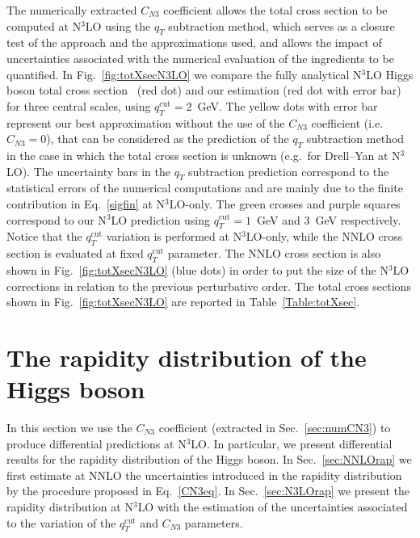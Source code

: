 \documentclass[12pt]{article}
\DeclareRobustCommand{\qt}{q_T}
\DeclareRobustCommand{\qtcut}{\ensuremath{q_T^\mathrm{cut}}}
\begin{document}
The numerically extracted $C_{N3}$ coefficient allows the total cross section to be computed at N$^{3}$LO using 
the $\qt$ subtraction method, which serves as a closure test of the approach and the approximations used,  and allows the impact of uncertainties associated with the numerical evaluation of the ingredients to be quantified. 
In Fig.~\ref{fig:totXsecN3LO} we compare the fully analytical N$^{3}$LO Higgs boson total cross section~\cite{Mistlberger:2018etf} (red dot) and our estimation (red dot with error bar) for three central scales, using $\qtcut=2$~GeV. The yellow dots with error bar represent our best approximation without the use of the $C_{N3}$ coefficient (i.e.\ $C_{N3}=0$), that can be considered as the prediction of the $\qt$ subtraction method in the case in which the total cross section is unknown (e.g.\ for Drell--Yan at N$^{3}$LO). The uncertainty bars in the $\qt$ subtraction prediction correspond to the statistical errors of the numerical computations and are mainly due to the finite contribution in Eq.~\eqref{sigfin} at N$^{3}$LO-only. The green crosses and purple squares correspond to our N$^{3}$LO prediction using $\qtcut=1$~GeV and 3~GeV respectively. Notice that the $\qtcut$ variation is performed at N$^{3}$LO-only, while the NNLO cross section is evaluated at fixed $\qtcut$ parameter.
The NNLO cross section is also shown in Fig.~\ref{fig:totXsecN3LO} (blue dots) in order to put the size of the N$^{3}$LO corrections in relation to the previous perturbative order. The total cross sections shown in Fig.~\ref{fig:totXsecN3LO} are reported in Table~\ref{Table:totXsec}.





\section{The rapidity distribution of the Higgs boson}
\label{sec:rapgen}
In this section we use the $C_{N3}$ coefficient (extracted in Sec.~\ref{sec:numCN3}) to produce differential predictions at N$^{3}$LO. In particular, we present differential results for the rapidity distribution of the Higgs boson. In Sec.~\ref{sec:NNLOrap}  we first estimate at NNLO the uncertainties introduced in the rapidity distribution by the procedure proposed in Eq.~\eqref{CN3eq}. In Sec.~\ref{sec:N3LOrap} we present the rapidity distribution at N$^{3}$LO with the
 estimation of the uncertainties associated to the variation of the $\qtcut$ and $C_{N3}$ parameters.
\end{document}
